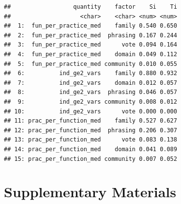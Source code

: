 \documentclass[
  11pt,
]{article}
\begin{document}
\begin{verbatim}
##                  quantity    factor    Si    Ti
##                    <char>    <char> <num> <num>
##  1:  fun_per_practice_med    family 0.540 0.650
##  2:  fun_per_practice_med  phrasing 0.167 0.244
##  3:  fun_per_practice_med      vote 0.094 0.164
##  4:  fun_per_practice_med    domain 0.049 0.112
##  5:  fun_per_practice_med community 0.010 0.055
##  6:          ind_ge2_vars    family 0.880 0.932
##  7:          ind_ge2_vars    domain 0.012 0.057
##  8:          ind_ge2_vars  phrasing 0.046 0.057
##  9:          ind_ge2_vars community 0.008 0.012
## 10:          ind_ge2_vars      vote 0.000 0.000
## 11: prac_per_function_med    family 0.527 0.627
## 12: prac_per_function_med  phrasing 0.206 0.307
## 13: prac_per_function_med      vote 0.083 0.138
## 14: prac_per_function_med    domain 0.041 0.089
## 15: prac_per_function_med community 0.007 0.052
\end{verbatim}

\hypertarget{supplementary-materials}{%
\section{Supplementary Materials}\label{supplementary-materials}}
\end{document}
